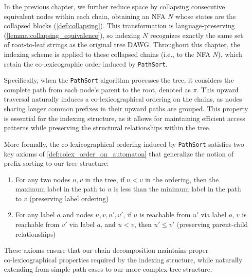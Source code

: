 In the previous chapter, we further reduce space by collapsing consecutive equivalent nodes within each chain, obtaining an NFA $N$ whose states are the collapsed blocks (\cref{def:collapsing}). This transformation is language-preserving (\cref{lemma:collapsing_equivalence}), so indexing $N$ recognizes exactly the same set of root-to-leaf strings as the original tree DAWG. Throughout this chapter, the indexing scheme is applied to these collapsed chains (i.e., to the NFA $N$), which retain the co-lexicographic order induced by \texttt{PathSort}.

Specifically, when the \texttt{PathSort} algorithm processes the tree, it considers the complete path from each node's parent to the root, denoted as $\pi$. This upward traversal naturally induces a co-lexicographical ordering on the chains, as nodes sharing longer common prefixes in their upward paths are grouped. This property is essential for the indexing structure, as it allows for maintaining efficient access patterns while preserving the structural relationships within the tree.

More formally, the co-lexicographical ordering induced by \texttt{PathSort} satisfies two key axioms of \cref{def:colex_order_on_automaton} that generalize the notion of prefix sorting to our tree structure:

\begin{enumerate}
    \item For any two nodes $u,v$ in the tree, if $u < v$ in the ordering, then the maximum label in the path to $u$ is less than the minimum label in the path to $v$ (preserving label ordering)
    \item For any label $a$ and nodes $u,v,u',v'$, if $u$ is reachable from $u'$ via label $a$, $v$ is reachable from $v'$ via label $a$, and $u < v$, then $u' \leq v'$ (preserving parent-child relationships)
\end{enumerate}

These axioms ensure that our chain decomposition maintains proper\\ co-lexicographical properties required by the indexing structure, while naturally extending from simple path cases to our more complex tree structure.

